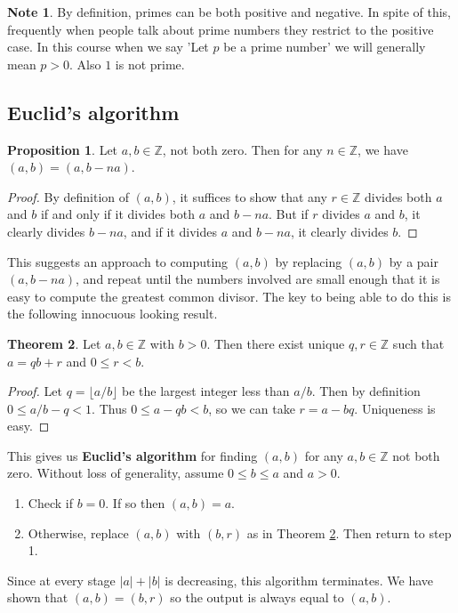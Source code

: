 \documentclass{article}
\newcommand{\Z}{\mathbb{Z}}
\newcommand{\rb}[1]{\left( #1 \right)}
\newcommand{\abs}[1]{\left\lvert #1 \right\rvert}
\theoremstyle{definition}\newtheorem{definition}{Definition}
\theoremstyle{definition}\newtheorem{remark}[definition]{Remark}
\theoremstyle{definition}\newtheorem*{example}{Example}
\theoremstyle{definition}\newtheorem*{note}{Note}
\newtheorem{proposition}[definition]{Proposition}
\newtheorem{theorem}[definition]{Theorem}
\begin{document}
\begin{note}
By definition, primes can be both positive and negative. In spite of this, frequently when people talk about prime numbers they restrict to the positive case. In this course when we say 'Let $ p $ be a prime number' we will generally mean $ p > 0 $. Also $ 1 $ is not prime.
\end{note}

\subsection{Euclid's algorithm}

\begin{proposition}
Let $ a, b \in \Z $, not both zero. Then for any $ n \in \Z $, we have $ \rb{a, b} = \rb{a, b - na} $.
\end{proposition}

\begin{proof}
By definition of $ \rb{a, b} $, it suffices to show that any $ r \in \Z $ divides both $ a $ and $ b $ if and only if it divides both $ a $ and $ b - na $. But if $ r $ divides $ a $ and $ b $, it clearly divides $ b - na $, and if it divides $ a $ and $ b - na $, it clearly divides $ b $.
\end{proof}

This suggests an approach to computing $ \rb{a, b} $ by replacing $ \rb{a, b} $ by a pair $ \rb{a, b - na} $, and repeat until the numbers involved are small enough that it is easy to compute the greatest common divisor. The key to being able to do this is the following innocuous looking result.

\begin{theorem}
\label{thm:5}
Let $ a, b \in \Z $ with $ b > 0 $. Then there exist unique $ q, r \in \Z $ such that $ a = qb + r $ and $ 0 \le r < b $.
\end{theorem}

\begin{proof}
Let $ q = \lfloor a / b \rfloor $ be the largest integer less than $ a / b $. Then by definition $ 0 \le a / b - q < 1 $. Thus $ 0 \le a - qb < b $, so we can take $ r = a - bq $. Uniqueness is easy.
\end{proof}

This gives us \textbf{Euclid's algorithm} for finding $ \rb{a, b} $ for any $ a, b \in \Z $ not both zero. Without loss of generality, assume $ 0 \le b \le a $ and $ a > 0 $.
\begin{enumerate}
\item Check if $ b = 0 $. If so then $ \rb{a, b} = a $.
\item Otherwise, replace $ \rb{a, b} $ with $ \rb{b, r} $ as in Theorem \ref{thm:5}. Then return to step 1.
\end{enumerate}
Since at every stage $ \abs{a} + \abs{b} $ is decreasing, this algorithm terminates. We have shown that $ \rb{a, b} = \rb{b, r} $ so the output is always equal to $ \rb{a, b} $.
\end{document}
